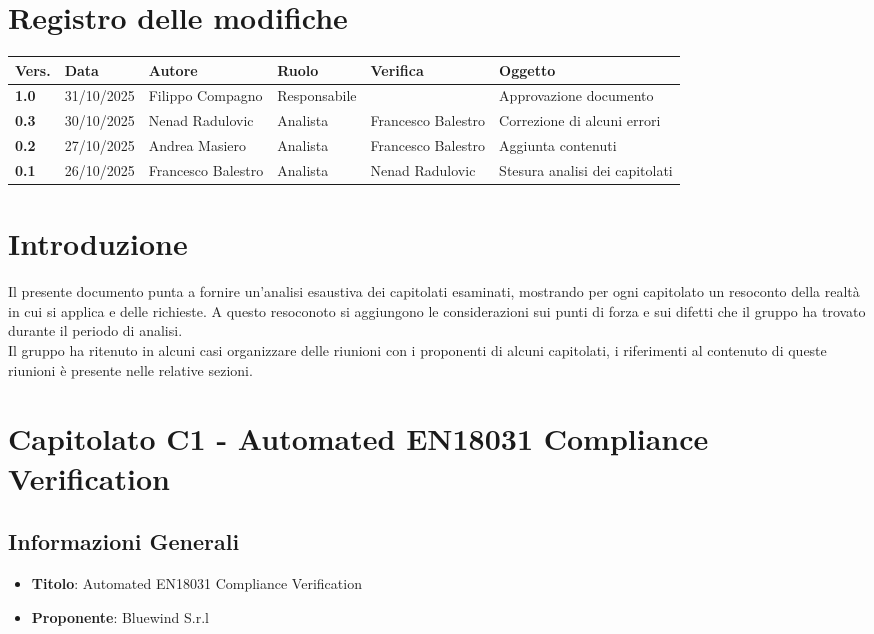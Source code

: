 \documentclass[a4paper,12pt]{article}
\begin{document}
    

    \newpage
    \section*{Registro delle modifiche} {
    \begin{table}[h!]
        \begin{tabularx}{\textwidth}{|l|l|l|l|L|L|}
        \hline
        \textbf{Vers.} & \textbf{Data} & \textbf{Autore} & \textbf{Ruolo} & \textbf{Verifica} & \textbf{Oggetto} \\
        \hline
        \textbf{1.0} & 31/10/2025 & Filippo Compagno & Responsabile & & Approvazione documento \\
        \textbf{0.3} & 30/10/2025 & Nenad Radulovic & Analista & Francesco Balestro & Correzione di alcuni errori \\
        \textbf{0.2} & 27/10/2025 & Andrea Masiero & Analista & Francesco Balestro & Aggiunta contenuti \\
        \textbf{0.1} & 26/10/2025 & Francesco Balestro & Analista & Nenad Radulovic & Stesura analisi dei capitolati \\
        \hline
        \end{tabularx}
        \end{table}
    }
    \newpage

    \tableofcontents
    \newpage

    \section{Introduzione}
    Il presente documento punta a fornire un'analisi esaustiva dei capitolati esaminati, mostrando per ogni capitolato un resoconto della realtà in cui si applica e delle richieste. A questo resoconoto si aggiungono le considerazioni sui punti di forza e sui difetti che il gruppo ha trovato durante il periodo di analisi. \\ Il gruppo ha ritenuto in alcuni casi organizzare delle riunioni con i proponenti di alcuni capitolati, i riferimenti al contenuto di queste riunioni è presente nelle relative sezioni.

    \section{Capitolato C1 - Automated EN18031 Compliance Verification}
    \subsection{Informazioni Generali}
        \begin{itemize}
            \item \textbf{Titolo}: Automated EN18031 Compliance Verification
            \item \textbf{Proponente}: Bluewind S.r.l
        \end{itemize}
\end{document}
